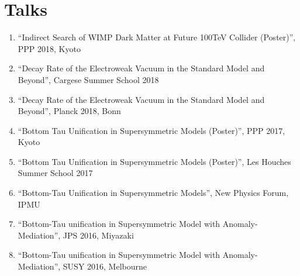 \documentclass[12pt]{article}
\begin{document}
\vspace{-5mm}


\nocite{*}

\section*{Talks}

\begin{enumerate}
 \item ``Indirect Search of WIMP Dark Matter at Future 100TeV Collider (Poster)'', PPP 2018, Kyoto
 \item ``Decay Rate of the Electroweak Vacuum in the Standard Model and Beyond'', Cargese Summer School 2018
 \item ``Decay Rate of the Electroweak Vacuum in the Standard Model and Beyond'', Planck 2018, Bonn
 \item ``Bottom Tau Unification in Supersymmetric Models (Poster)'', PPP 2017, Kyoto
 \item ``Bottom Tau Unification in Supersymmetric Models (Poster)'', Les Houches Summer School 2017
 \item ``Bottom-Tau Unification in Supersymmetric Models'', New Physics Forum, IPMU
 \item ``Bottom-Tau unification in Supersymmetric Model with Anomaly-Mediation'', JPS 2016, Miyazaki
 \item ``Bottom-Tau unification in Supersymmetric Model with Anomaly-Mediation'', SUSY 2016, Melbourne
\end{enumerate}
\end{document}
